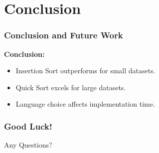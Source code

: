 \section{Conclusion}
\begin{frame}
  \frametitle{Conclusion and Future Work}

  \textbf{Conclusion:}
  \begin{itemize}
    \item Insertion Sort outperforms for small datasets.
    \item Quick Sort excels for large datasets.
    \item Language choice affects implementation time.
  \end{itemize}

  \vspace{1em}
\end{frame}

\begin{frame}
\frametitle{Good Luck!}
\begin{center}
        \Huge Any Questions?
    \end{center}

\end{frame}